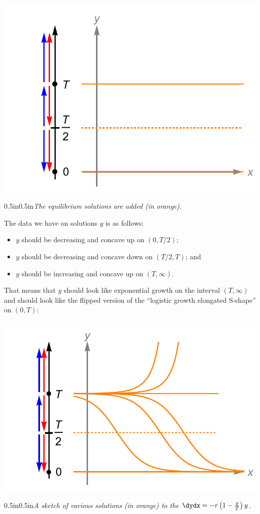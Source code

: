 \documentclass[12pt]{article}
\theoremstyle{definition}
\theoremstyle{underl}
\newcommand{\capt}[1]{\begin{adjustwidth}{0.5in}{0.5in}\centering\small\textit{#1}\end{adjustwidth}}
\begin{document}
	\begin{center}
		\includegraphics[align=c,scale=0.875]{Ex1_xy_2}
		\vspace{1.5mm}
		\capt{The equilibrium solutions are added (in orange).}
	\end{center}
	The data we have on solutions $y$ is as follows:
	\begin{itemize}
		\item $y$ should be decreasing and concave up on $(0,T/2)$;
		\item $y$ should be decreasing and concave down on $(T/2,T)$; and
		\item $y$ should be increasing and concave up on $(T,\infty)$.
	\end{itemize}
	That means that $y$ should look like exponential growth on the interval $(T,\infty)$ and should look like the flipped version of the ``logistic growth elongated S-shape'' on $(0,T)$:
	\vspace{-6mm}
	\begin{center}
		\includegraphics[align=c,scale=1]{Ex1_xy_3}
		\vspace{1.5mm}
		\capt{A sketch of various solutions (in orange) to the {\normalfont{ODE}} $\dydx = -r\left(1-\frac{y}{T}\right) y$.}
	\end{center}
\end{document}
